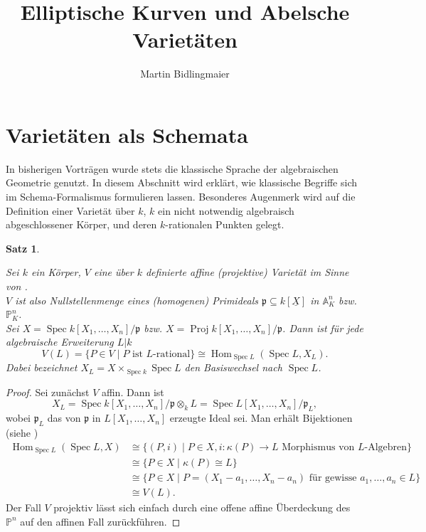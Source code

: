 \documentclass{amsart}
\theoremstyle{plain}
\newtheorem{proposition}[subsection]{Satz}
\theoremstyle{definition}
\newcommand{\projspace}{\mathds{P}}
\newcommand{\affinespace}{\mathds{A}}
\newcommand{\spec}{\operatorname{Spec}}
\newcommand{\proj}{\operatorname{Proj}}
\renewcommand{\hom}{\operatorname{Hom}}
\newcommand{\idealp}{\mathfrak{p}}
\begin{document}
\title{Elliptische Kurven und Abelsche Varietäten}
\author{Martin Bidlingmaier}
\maketitle

\section{Varietäten als Schemata}
\label{section-varietaeten-als-schemata}

In bisherigen Vorträgen wurde stets die klassische Sprache der algebraischen Geometrie genutzt.
In diesem Abschnitt wird erklärt, wie klassische Begriffe sich im Schema-Formalismus formulieren lassen.
Besonderes Augenmerk wird auf die Definition einer \glqq Varietät über $k$\grqq, $k$ ein nicht notwendig algebraisch abgeschlossener Körper, und deren $k$-rationalen Punkten gelegt.

\begin{proposition}
	\label{prop-rationale-punkte}

	Sei $k$ ein Körper, $V$ eine über $k$ definierte affine (projektive) Varietät im Sinne von \cite[Kap.~I]{silverman}. \\
	$V$ ist also Nullstellenmenge eines (homogenen) Primideals $\idealp \subseteq k[\underline{X}]$ in $\affinespace_K^n$ bzw. $\projspace_K^n$. \\
	Sei $X = \spec k[X_1, \dots, X_n] / \idealp$ bzw. $X = \proj k[X_1, \dots, X_n] / \idealp$. Dann ist für jede algebraische Erweiterung $L | k$
	\begin{equation*}
		V(L) = \{P \in V \mid P \text{ ist } L\text{-rational}\} \cong \hom_{\spec L}(\spec L, X_L).
	\end{equation*}
	Dabei bezeichnet $X_L = X \times_{\spec k} \spec L$ den Basiswechsel nach $\spec L$.
\end{proposition}
\begin{proof}
	Sei zunächst $V$ affin. Dann ist
	\begin{equation*}
		X_L = \spec k[X_1, \dots, X_n] / \idealp \otimes_k L = \spec L[X_1, \dots, X_n] / \idealp_L,
	\end{equation*}
	wobei $\idealp_L$ das von $\idealp$ in $L[X_1, \dots, X_n]$ erzeugte Ideal sei.
	Man erhält Bijektionen (siehe \cite[§3 Prop. 3.8]{gortz-wedhorn})
	\begin{align*}
		\hom_{\spec L}(\spec L, X)
			& \cong \{(P, i) \mid P \in X, i \colon \kappa(P) \rightarrow L \text{ Morphismus von } L \text{-Algebren}\} \\
			& \cong \{P \in X \mid \kappa(P) \cong L\} \\
			& \cong \{P \in X \mid P = (X_1 - a_1, \dots, X_n - a_n) \text{ für gewisse } a_1, \dots, a_n \in L\} \\
			& \cong V(L).
	\end{align*}
	Der Fall $V$ projektiv lässt sich einfach durch eine offene affine Überdeckung des $\projspace^n$ auf den affinen Fall zurückführen.
\end{proof}
\end{document}
